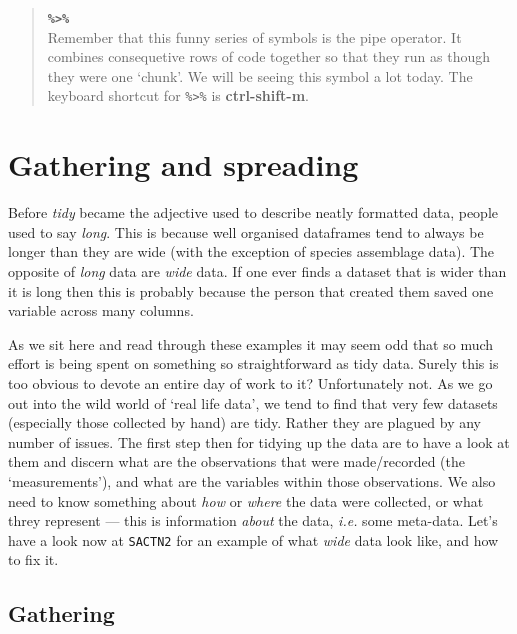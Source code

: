 \documentclass[
]{book}
\begin{document}
\begin{quote}
\textbf{\texttt{\%\textgreater{}\%}}~\\
Remember that this funny series of symbols is the pipe operator. It combines consequetive rows of code together so that they run as though they were one `chunk'. We will be seeing this symbol a lot today. The keyboard shortcut for \texttt{\%\textgreater{}\%} is \textbf{ctrl-shift-m}.
\end{quote}

\hypertarget{gathering-and-spreading}{%
\section{Gathering and spreading}\label{gathering-and-spreading}}

Before \emph{tidy} became the adjective used to describe neatly formatted data, people used to say \emph{long}. This is because well organised dataframes tend to always be longer than they are wide (with the exception of species assemblage data). The opposite of \emph{long} data are \emph{wide} data. If one ever finds a dataset that is wider than it is long then this is probably because the person that created them saved one variable across many columns.

As we sit here and read through these examples it may seem odd that so much effort is being spent on something so straightforward as tidy data. Surely this is too obvious to devote an entire day of work to it? Unfortunately not. As we go out into the wild world of `real life data', we tend to find that very few datasets (especially those collected by hand) are tidy. Rather they are plagued by any number of issues. The first step then for tidying up the data are to have a look at them and discern what are the observations that were made/recorded (the `measurements'), and what are the variables within those observations. We also need to know something about \emph{how} or \emph{where} the data were collected, or what threy represent --- this is information \emph{about} the data, \emph{i.e.} some meta-data. Let's have a look now at \texttt{SACTN2} for an example of what \emph{wide} data look like, and how to fix it.

\hypertarget{gathering}{%
\subsection{Gathering}\label{gathering}}
\end{document}
